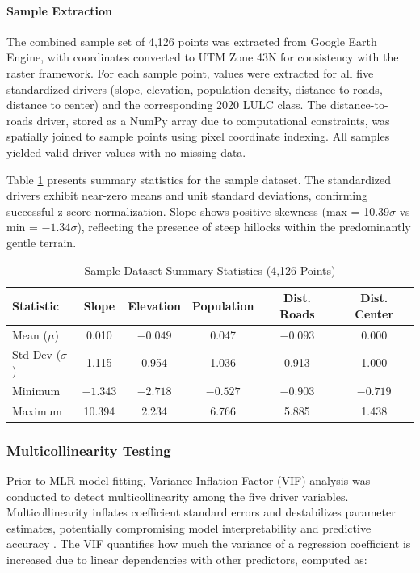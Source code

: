 \documentclass[12pt,a4paper]{article}
\begin{document}
\paragraph{Sample Extraction}
The combined sample set of 4,126 points was extracted from Google Earth Engine, with coordinates converted to UTM Zone 43N for consistency with the raster framework. For each sample point, values were extracted for all five standardized drivers (slope, elevation, population density, distance to roads, distance to center) and the corresponding 2020 LULC class. The distance-to-roads driver, stored as a NumPy array due to computational constraints, was spatially joined to sample points using pixel coordinate indexing. All samples yielded valid driver values with no missing data.

Table \ref{tab:sample_summary} presents summary statistics for the sample dataset. The standardized drivers exhibit near-zero means and unit standard deviations, confirming successful z-score normalization. Slope shows positive skewness (max = 10.39$\sigma$ vs min = $-1.34\sigma$), reflecting the presence of steep hillocks within the predominantly gentle terrain.

\begin{table}[H]
\caption{Sample Dataset Summary Statistics (4,126 Points)}
\label{tab:sample_summary}
\centering
\small
\renewcommand{\arraystretch}{1.1}
\begin{tabular}{lccccc}
\toprule
\textbf{Statistic} & \textbf{Slope} & \textbf{Elevation} & \textbf{Population} & \textbf{Dist. Roads} & \textbf{Dist. Center} \\
\midrule
Mean ($\mu$) & 0.010 & $-0.049$ & 0.047 & $-0.093$ & 0.000 \\
Std Dev ($\sigma$) & 1.115 & 0.954 & 1.036 & 0.913 & 1.000 \\
Minimum & $-1.343$ & $-2.718$ & $-0.527$ & $-0.903$ & $-0.719$ \\
Maximum & 10.394 & 2.234 & 6.766 & 5.885 & 1.438 \\
\bottomrule
\end{tabular}
\end{table}

\subsubsection{Multicollinearity Testing}

Prior to MLR model fitting, Variance Inflation Factor (VIF) analysis was conducted to detect multicollinearity among the five driver variables. Multicollinearity inflates coefficient standard errors and destabilizes parameter estimates, potentially compromising model interpretability and predictive accuracy . The VIF quantifies how much the variance of a regression coefficient is increased due to linear dependencies with other predictors, computed as:
\end{document}
